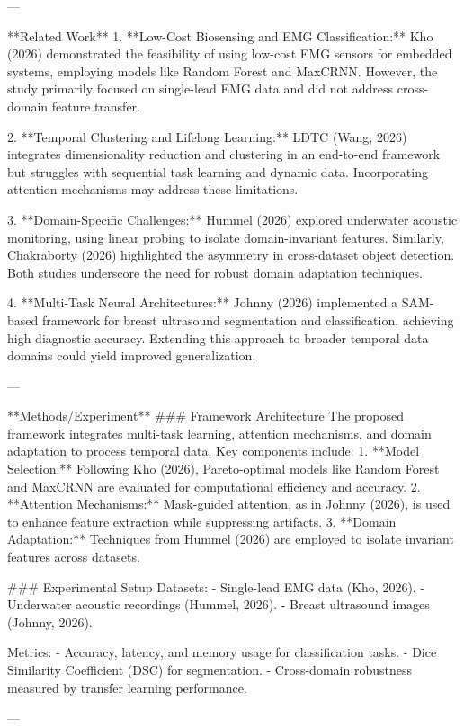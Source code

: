 ---

**Related Work**  
1. **Low-Cost Biosensing and EMG Classification:**  
Kho (2026) demonstrated the feasibility of using low-cost EMG sensors for embedded systems, employing models like Random Forest and MaxCRNN. However, the study primarily focused on single-lead EMG data and did not address cross-domain feature transfer.

2. **Temporal Clustering and Lifelong Learning:**  
LDTC (Wang, 2026) integrates dimensionality reduction and clustering in an end-to-end framework but struggles with sequential task learning and dynamic data. Incorporating attention mechanisms may address these limitations.

3. **Domain-Specific Challenges:**  
Hummel (2026) explored underwater acoustic monitoring, using linear probing to isolate domain-invariant features. Similarly, Chakraborty (2026) highlighted the asymmetry in cross-dataset object detection. Both studies underscore the need for robust domain adaptation techniques.

4. **Multi-Task Neural Architectures:**  
Johnny (2026) implemented a SAM-based framework for breast ultrasound segmentation and classification, achieving high diagnostic accuracy. Extending this approach to broader temporal data domains could yield improved generalization.

---

**Methods/Experiment**  
### Framework Architecture  
The proposed framework integrates multi-task learning, attention mechanisms, and domain adaptation to process temporal data. Key components include:  
1. **Model Selection:** Following Kho (2026), Pareto-optimal models like Random Forest and MaxCRNN are evaluated for computational efficiency and accuracy.  
2. **Attention Mechanisms:** Mask-guided attention, as in Johnny (2026), is used to enhance feature extraction while suppressing artifacts.  
3. **Domain Adaptation:** Techniques from Hummel (2026) are employed to isolate invariant features across datasets.  

### Experimental Setup  
Datasets:  
- Single-lead EMG data (Kho, 2026).  
- Underwater acoustic recordings (Hummel, 2026).  
- Breast ultrasound images (Johnny, 2026).  

Metrics:  
- Accuracy, latency, and memory usage for classification tasks.  
- Dice Similarity Coefficient (DSC) for segmentation.  
- Cross-domain robustness measured by transfer learning performance.

---

